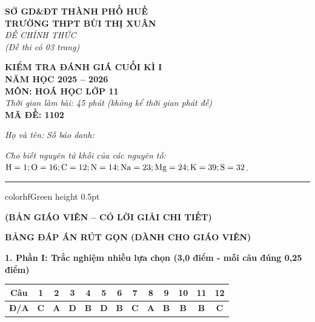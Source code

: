 \documentclass[11pt,a4paper]{article}
\begin{document}
\begin{minipage}[t]{0.48\textwidth}
\textbf{SỞ GD\&ĐT THÀNH PHỐ HUẾ}\\
\textbf{TRƯỜNG THPT BÙI THỊ XUÂN}\\
\textit{ĐỀ CHÍNH THỨC}\\
\textit{(Đề thi có 03 trang)}
\end{minipage}
\hfill
\begin{minipage}[t]{0.48\textwidth}
\raggedleft
\textbf{\color{hfRed}KIỂM TRA ĐÁNH GIÁ CUỐI KÌ I}\\
\textbf{NĂM HỌC 2025 -- 2026}\\
\textbf{MÔN: HOÁ HỌC LỚP 11}\\
\textit{Thời gian làm bài: 45 phút (không kể thời gian phát đề)}\\
\textbf{MÃ ĐỀ: 1102}
\end{minipage}

\vspace{4pt}
\noindent
\textit{Họ và tên:} \dotfill \textit{Số báo danh:} \dotfill

\vspace{3pt}
\noindent
\textit{\footnotesize Cho biết nguyên tử khối của các nguyên tố: $\ce{H} = 1; \ce{O} = 16; \ce{C} = 12; \ce{N} = 14; \ce{Na} = 23; \ce{Mg} = 24; \ce{K} = 39; \ce{S} = 32$.}

\vspace{3pt}
\hrule color{hfGreen} height 0.5pt

\vspace{4pt}
\begin{center}
\textbf{\color{hfRed}\large (BẢN GIÁO VIÊN -- CÓ LỜI GIẢI CHI TIẾT)}
\end{center}

\vspace{2pt}
\begin{center}
{\color{hfRed}\textbf{\large BẢNG ĐÁP ÁN RÚT GỌN (DÀNH CHO GIÁO VIÊN)}}
\end{center}

\vspace{2pt}
\noindent
\textbf{\color{mainGreen}1. Phần I: Trắc nghiệm nhiều lựa chọn (3,0 điểm - mỗi câu đúng 0,25 điểm)}
\begin{center}
\renewcommand{\arraystretch}{1.2}
\begin{tabular}{|c|c|c|c|c|c|c|c|c|c|c|c|c|}
\hline
\rowcolor{tableGreen}
\textbf{Câu} & \textbf{1} & \textbf{2} & \textbf{3} & \textbf{4} & \textbf{5} & \textbf{6} & \textbf{7} & \textbf{8} & \textbf{9} & \textbf{10} & \textbf{11} & \textbf{12} \\
\hline
\textbf{Đ/A} & \textbf{\color{hfRed}C} & \textbf{\color{hfRed}A} & \textbf{\color{hfRed}D} & \textbf{\color{hfRed}B} & \textbf{\color{hfRed}D} & \textbf{\color{hfRed}B} & \textbf{\color{hfRed}C} & \textbf{\color{hfRed}A} & \textbf{\color{hfRed}B} & \textbf{\color{hfRed}B} & \textbf{\color{hfRed}B} & \textbf{\color{hfRed}C} \\
\hline
\end{tabular}
\end{center}
\end{document}
